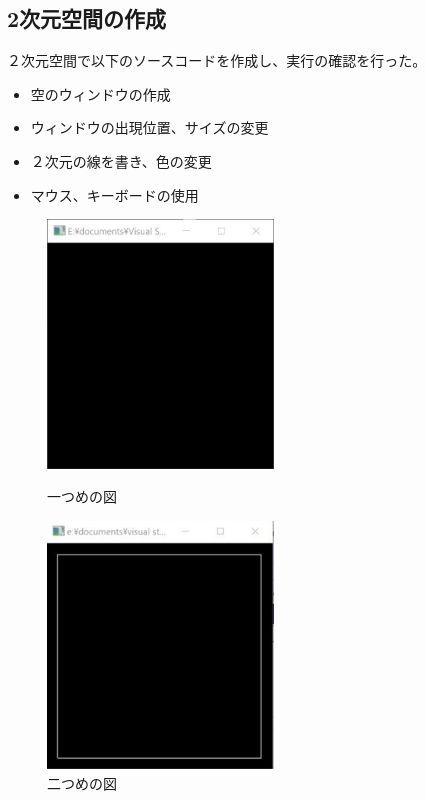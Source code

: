 \documentclass{jsarticle}
\begin{document}
\subsection{2次元空間の作成}
２次元空間で以下のソースコードを作成し、実行の確認を行った。
\begin{itemize}
  \item 空のウィンドウの作成
  \item ウィンドウの出現位置、サイズの変更
  \item ２次元の線を書き、色の変更
  \item マウス、キーボードの使用
\end{itemize}

\begin{figure}[htbp]
 \begin{minipage}{0.5\hsize}
  \begin{center}
   \includegraphics[width=6cm]{emptyWindow.jpg}
  \end{center}
  \caption{一つめの図}
  \label{fig:one}
 \end{minipage}
 \begin{minipage}{0.5\hsize}
  \begin{center}
   \includegraphics[width=6cm]{whiteSquare.jpg}
  \end{center}
  \caption{二つめの図}
  \label{fig:two}
 \end{minipage}
\end{figure}
\end{document}
